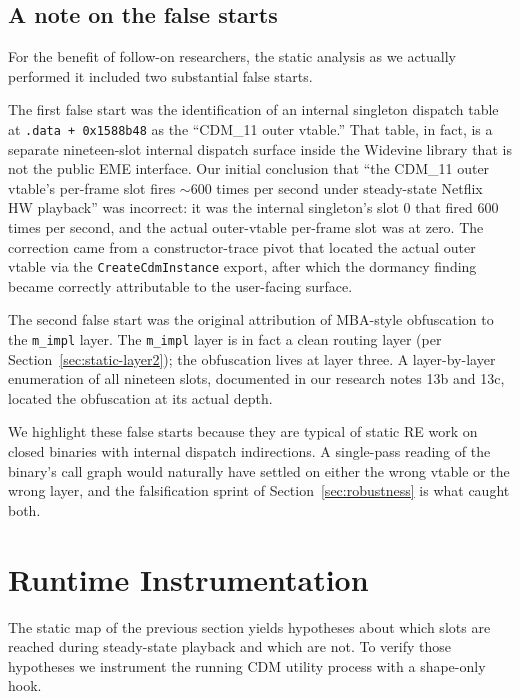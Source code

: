 \documentclass[11pt,letterpaper]{article}
\let\oldsection\section
\renewcommand{\section}{\clearpage\oldsection}
\begin{document}
\subsection{A note on the false starts}
\label{sec:static-false}

For the benefit of follow-on researchers, the static analysis as we
actually performed it included two substantial false starts.

The first false start was the identification of an internal
singleton dispatch table at \texttt{.data + 0x1588b48} as the
``CDM\_11 outer vtable.'' That table, in fact, is a separate
nineteen-slot internal dispatch surface inside the Widevine library
that is not the public EME interface. Our initial conclusion that
``the CDM\_11 outer vtable's per-frame slot fires
$\sim$600 times per second under steady-state Netflix HW playback''
was incorrect: it was the internal singleton's slot 0 that fired
600 times per second, and the actual outer-vtable per-frame slot
was at zero. The correction came from a constructor-trace pivot
that located the actual outer vtable via the
\texttt{CreateCdmInstance} export, after which the dormancy finding
became correctly attributable to the user-facing surface.

The second false start was the original attribution of MBA-style
obfuscation to the \texttt{m\_impl} layer. The \texttt{m\_impl}
layer is in fact a clean routing layer (per
Section~\ref{sec:static-layer2}); the obfuscation lives at layer
three. A layer-by-layer enumeration of all nineteen slots,
documented in our research notes 13b and 13c, located the
obfuscation at its actual depth.

We highlight these false starts because they are typical of static
RE work on closed binaries with internal dispatch indirections.
A single-pass reading of the binary's call graph would naturally
have settled on either the wrong vtable or the wrong layer, and
the falsification sprint of Section~\ref{sec:robustness} is what
caught both.

\section{Runtime Instrumentation}
\label{sec:runtime}

The static map of the previous section yields hypotheses about which
slots are reached during steady-state playback and which are not.
To verify those hypotheses we instrument the running CDM utility
process with a shape-only hook.
\end{document}
